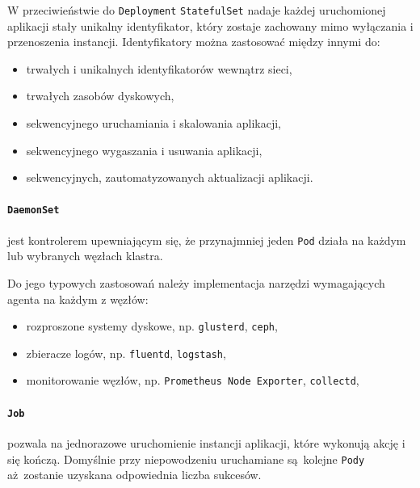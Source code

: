 \documentclass[a4paper,12pt,twoside,openany]{report}
\providecommand{\tightlist}{%
  \setlength{\itemsep}{0pt}\setlength{\parskip}{0pt}}
\newcommand{\passthrough}[1]{#1}
\begin{document}
W przeciwieństwie do \passthrough{\lstinline!Deployment!}
\passthrough{\lstinline!StatefulSet!} nadaje każdej uruchomionej
aplikacji stały unikalny identyfikator, który zostaje zachowany mimo
wyłączania i przenoszenia instancji. Identyfikatory można zastosować
między innymi do:

\begin{itemize}
\tightlist
\item
  trwałych i unikalnych identyfikatorów wewnątrz sieci,
\item
  trwałych zasobów dyskowych,
\item
  sekwencyjnego uruchamiania i skalowania aplikacji,
\item
  sekwencyjnego wygaszania i usuwania aplikacji,
\item
  sekwencyjnych, zautomatyzowanych aktualizacji aplikacji.
\end{itemize}

\hypertarget{daemonset}{%
\paragraph{\texorpdfstring{\texttt{DaemonSet}}{DaemonSet}}\label{daemonset}}

jest kontrolerem upewniającym się, że przynajmniej jeden
\passthrough{\lstinline!Pod!} działa na każdym lub wybranych węzłach
klastra.

Do jego typowych zastosowań należy implementacja narzędzi wymagających
agenta na każdym z węzłów:

\begin{itemize}
\tightlist
\item
  rozproszone systemy dyskowe, np. \passthrough{\lstinline!glusterd!},
  \passthrough{\lstinline!ceph!},
\item
  zbieracze logów, np. \passthrough{\lstinline!fluentd!},
  \passthrough{\lstinline!logstash!},
\item
  monitorowanie węzłów, np.
  \passthrough{\lstinline!Prometheus Node Exporter!},
  \passthrough{\lstinline!collectd!},
\end{itemize}

\hypertarget{job}{%
\paragraph{\texorpdfstring{\texttt{Job}}{Job}}\label{job}}

pozwala na jednorazowe uruchomienie instancji aplikacji, które wykonują
akcję i się kończą. Domyślnie przy niepowodzeniu uruchamiane są~kolejne
\passthrough{\lstinline!Pody!} aż~zostanie uzyskana odpowiednia liczba
sukcesów.
\end{document}
